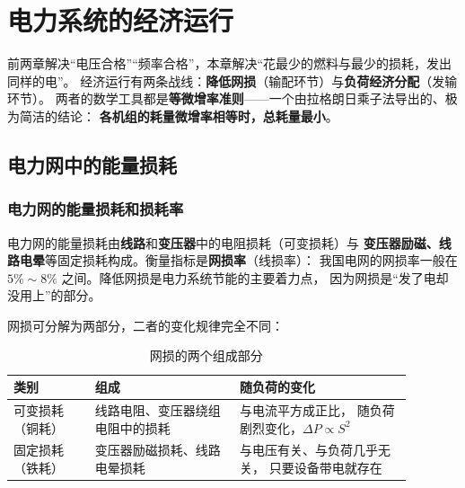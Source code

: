 ﻿%

\chapter{电力系统的经济运行}

前两章解决“电压合格”“频率合格”，本章解决“花最少的燃料与最少的损耗，发出同样的电”。
经济运行有两条战线：\textbf{降低网损}（输配环节）与\textbf{负荷经济分配}（发输环节）。
两者的数学工具都是\textbf{等微增率准则}——一个由拉格朗日乘子法导出的、极为简洁的结论：
\textbf{各机组的耗量微增率相等时，总耗量最小}。

\section{电力网中的能量损耗}

\subsection{电力网的能量损耗和损耗率}

电力网的能量损耗由\textbf{线路}和\textbf{变压器}中的电阻损耗（可变损耗）与
\textbf{变压器励磁、线路电晕}等固定损耗构成。衡量指标是\textbf{网损率}（线损率）：
我国电网的网损率一般在 $5\%\sim8\%$ 之间。降低网损是电力系统节能的主要着力点，
因为网损是“发了电却没用上”的部分。

网损可分解为两部分，二者的变化规律完全不同：

\begin{table}[htbp]
  \centering
  \caption{网损的两个组成部分}
  \small
  \begin{tabular}{@{}p{0.18\linewidth}p{0.32\linewidth}p{0.38\linewidth}@{}}
    \toprule
    类别 & 组成 & 随负荷的变化 \\
    \midrule
    可变损耗（铜耗） & 线路电阻、变压器绕组电阻中的损耗 & 与电流平方成正比，
      随负荷剧烈变化，$\Delta P\propto S^{2}$ \\
    固定损耗（铁耗） & 变压器励磁损耗、线路电晕损耗 & 与电压有关、与负荷几乎无关，
      只要设备带电就存在 \\
    \bottomrule
  \end{tabular}
\end{table}

